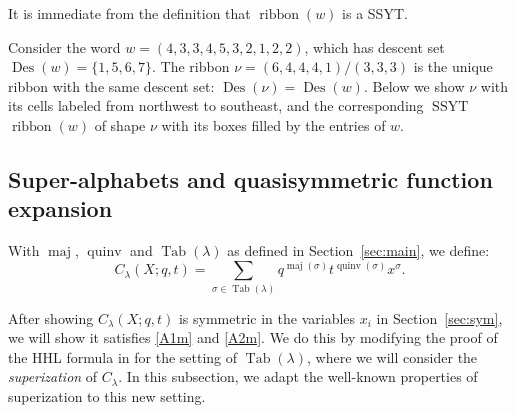 \documentclass[ALCO,Unicode]{cedram}
\DeclareMathOperator{\PQT}{Tab}
\DeclareMathOperator{\maj}{maj}
\DeclareMathOperator{\Des}{Des}
\DeclareMathOperator{\ribbon}{ribbon}
\DeclareMathOperator{\quinv}{quinv}
\DeclareMathOperator{\SSYT}{SSYT}
\newcommand\cell[3]{
\def\i{#1} \def\j{#2} \def\entry{#3}

\draw (\j-1,-\i)--(\j,-\i)--(\j,-\i+1)--(\j-1,-\i+1)--(\j-1,-\i);
\node at (\j-.5,-\i+.5) {\entry};
}
\begin{document}
It is immediate from the definition that $\ribbon(w)$ is a SSYT. 


\begin{example}
Consider the word $w=(4,3,3,4,5,3,2,1,2,2)$, which has descent set $\Des(w)= \{1,5,6,7\}$. The ribbon $\nu=(6,4,4,4,1)/(3,3,3)$ is the unique ribbon with the same descent set: $\Des(\nu)=\Des(w)$. Below we show $\nu$ with its cells labeled from northwest to southeast, and the corresponding $\SSYT$ $\ribbon(w)$ of shape $\nu$ with its boxes filled by the entries of $w$. 


\begin{center}
\end{center}

\end{example}



\subsection{Super-alphabets and quasisymmetric function expansion}\label{sec:superization}

With $\maj$, $\quinv$  and $\PQT(\lambda)$ as defined in Section~\ref{sec:main}, we define:
\begin{equation}\label{eq:C}
C_{\lambda}(X;q,t) = \sum_{\sigma\in \PQT(\lambda)} q^{\maj(\sigma)} t^{\quinv(\sigma)}x^{\sigma}.
\end{equation} 

After showing $C_{\lambda}(X;q,t)$ is symmetric in the variables $x_i$ in Section~\ref{sec:sym}, we will show it satisfies \eqref{A1m} and \eqref{A2m}. We do this by modifying the proof of the HHL formula in \cite[Section 4]{HHL05} for the setting of $\PQT(\lambda)$, where we will consider the \emph{superization} of $C_{\lambda}$. In this subsection, we adapt the well-known properties of superization to this new setting.
\end{document}
